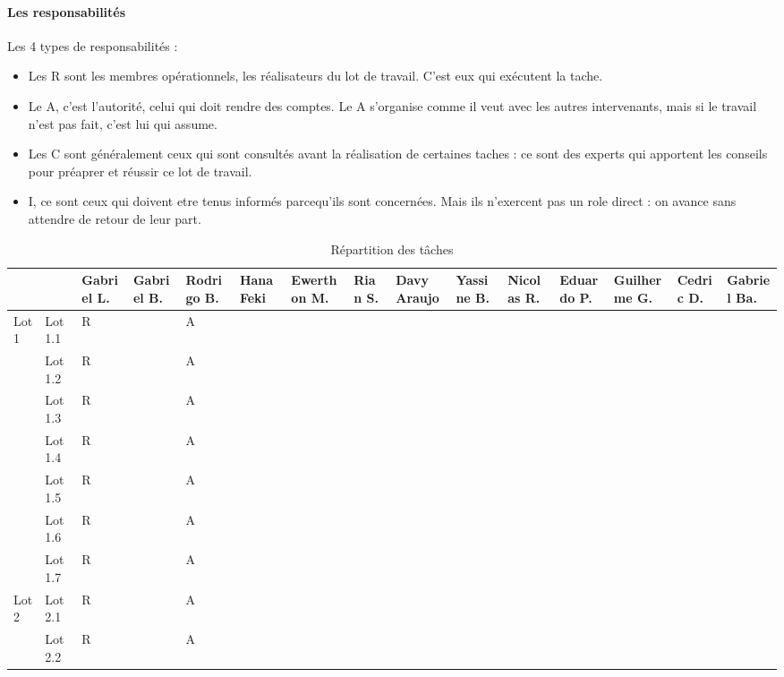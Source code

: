 \paragraph*{Les responsabilités}
Les 4 types de responsabilités :
\begin{itemize}
	\item Les R sont les membres opérationnels, les réalisateurs du lot de travail. C'est eux qui exécutent la tache.
	\item Le A, c'est l'autorité, celui qui doit rendre des comptes. Le A s'organise comme il veut avec les autres intervenants, mais si le travail n'est pas fait, c'est lui qui assume.
	\item Les C sont généralement ceux qui sont consultés avant la réalisation de certaines taches : ce sont des experts qui apportent les conseils pour préaprer et réussir ce lot de travail.
	\item I, ce sont ceux qui doivent etre tenus informés parcequ'ils sont concernées. Mais ils n'exercent pas un role direct : on avance sans attendre de retour de leur part.
\end{itemize}
\begin{table}
\begin{tabular}{|p{1.2cm}|p{1.2cm}|p{1.2cm}|p{1.2cm}|p{1.2cm}|p{1.2cm}|p{1.2cm}|p{1.2cm}|p{1.2cm}|p{1.2cm}|p{1.2cm}|p{1.2cm}|p{1.2cm}|p{1.2cm}|p{1.2cm}|}
    \hline
    & & Gabriel L.
    &Gabriel B.
    &Rodrigo B.
    &Hana Feki
    &Ewerthon M.
    &Rian S.
    &Davy Araujo
    &Yassine B.
    &Nicolas R.
    &Eduardo P.
    &Guilherme G.
    &Cedric D.
    &Gabriel Ba.\\
    \hline
    \multirow{7}{*}{Lot 1} 
          & Lot 1.1 & R & & A & & & & & & & & & &\\
          \cline{2-15}
          & Lot 1.2 & R & & A & & & & & & & & & &\\
          \cline{2-15}
          & Lot 1.3 & R & & A & & & & & & & & & &\\
          \cline{2-15}
          & Lot 1.4 & R & & A & & & & & & & & & &\\
          \cline{2-15}
          & Lot 1.5 & R & & A & & & & & & & & & &\\
          \cline{2-15}
          & Lot 1.6 & R & & A & & & & & & & & & &\\
          \cline{2-15}
          & Lot 1.7 & R & & A & & & & & & & & & &\\
    \hline
    \multirow{2}{*}{Lot 2}
          & Lot 2.1 & R & & A & & & & & & & & & &\\
          \cline{2-15}
          & Lot 2.2 & R & & A & & & & & & & & & &\\
    \hline
\end{tabular}
\caption{Répartition des tâches}
\label{table:repartition}
\end{table}
\clearpage
